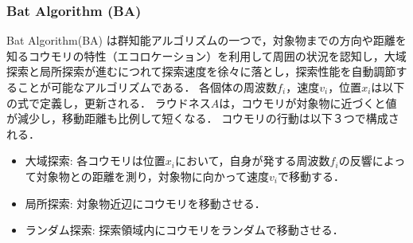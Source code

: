 \documentclass[a4j,11pt]{jarticle}
\begin{document}
\subsubsection{Bat Algorithm (BA)}
\label{sss:BA}


Bat Algorithm(BA) \cite{BA}は群知能アルゴリズムの一つで，対象物までの方向や距離を知るコウモリの特性（エコロケーション）を利用して周囲の状況を認知し，大域探索と局所探索が進むにつれて探索速度を徐々に落とし，探索性能を自動調節することが可能なアルゴリズムである．
各個体の周波数${f_i}$，速度${v_i}$，位置${x_i}$は以下の式で定義し，更新される．
ラウドネス${A}$は，コウモリが対象物に近づくと値が減少し，移動距離も比例して短くなる．
コウモリの行動は以下３つで構成される．
\begin{itemize}
\item 大域探索: 各コウモリは位置${x_i}$において，自身が発する周波数${f_i}$の反響によって対象物との距離を測り，対象物に向かって速度${v_i}$で移動する．
\item 局所探索: 対象物近辺にコウモリを移動させる．
\item ランダム探索: 探索領域内にコウモリをランダムで移動させる．
\end{itemize}
\end{document}
